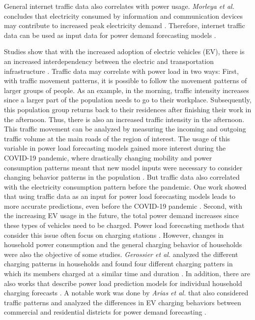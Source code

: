 General internet traffic data also correlates with power usage.
\textit{Morleya et al.} concludes that 
electricity consumed by information and communication devices
may contribute to increased peak electricity demand 
\cite{internettrafficenergycorrelation}.
Therefore, internet traffic data can be used as input data for 
power demand forecasting models \cite{electricityinternetforecast}. 

Studies show that with the increased adoption of electric vehicles (EV), 
there is an increased interdependency between the electric and 
transportation infrastructure \cite{interdependnytrafficenergy}. 
Traffic data may correlate with power load in two ways:
First, with traffic movement patterns, it is possible to follow the
movement patterns of larger groups of people. As an example, in the morning,
traffic intensity increases since a larger part of the population needs
to go to their workplace. Subsequently, this population group
returns back to their residences after finishing their work in the afternoon.
Thus, there is also an increased traffic intensity in the afternoon.
This traffic movement can be analyzed by measuring the 
incoming and outgoing traffic volume at the main roads of the 
region of interest. The usage of this variable in power load
forecasting models gained more interest during the COVID-19 pandemic, 
where drastically changing mobility and power consumption 
patterns meant that new model inputs were necessary to consider changing
behavior patterns in the population 
\cite{covidtrafficpower} \cite{covidtrafficpower2}.
But traffic data also correlated with the electricity consumption pattern
before the pandemic. One work showed that
using traffic data as an input for power load
forecasting models leads to more accurate predictions, even before
the COVID-19 pandemic \cite{causalmodeltrafficelectricity}.
Second, with the increasing EV usage in the future, 
the total power demand increases since these types of vehicles 
need to be charged. Power load forecasting methods that consider this
issue often focus on charging stations \cite{evcharchingstations}
\cite{evcharchingstations2}. However, changes in household power consumption 
and the general charging behavior of households
were also the objective of some studies. \textit{Gerossier et al.}
analyzed the different charging patterns in households
and found four different charging patters in which its members charged at 
a similar time and duration \cite{gerossier2019modeling}.
In addition, there are also works that describe
power load prediction models for individual household
charging forecasts \cite{skala2023interval}. 
A notable work was done by \textit{Arias et al.} that also considered 
traffic patterns
and analyzed the differences in EV charging behaviors between
commercial and residential districts for power demand forecasting
\cite{arias2016electric}.

